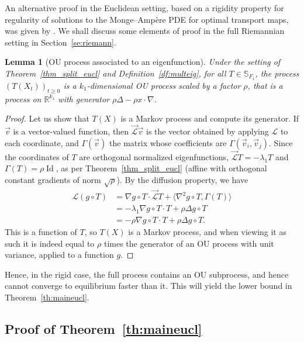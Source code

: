 \documentclass[10pt,reqno]{amsart}
\newtheorem{lemma}[theorem]{Lemma}
\numberwithin{equation}{section}
\begin{document}
An alternative proof in the Euclidean setting, based on a rigidity property
for regularity of solutions to the Monge--Ampère PDE for optimal transport
maps, was given by \cite{DPF17}. We shall discuss some elements of proof in
the full Riemannian setting in Section~\ref{se:riemann}.

\begin{lemma}[OU process associated to an eigenfunction] \label{lem_proj_ou}
  Under the setting of Theorem~\ref{thm_split_eucl} and
  Definition~\ref{df:multeig}, for all $T \in \mathbb{S}_{F_1}$, the process
  ${(T(X_t))}_{t\geq0}$ is a $k_1$-dimensional OU process scaled by a factor
  $\rho$, that is a process on $\mathbb{R}^{k_1}$ with generator
  $\rho \Delta - \rho x \cdot \nabla$.
\end{lemma}

\begin{proof}
  Let us show that $T(X)$ is a Markov process and compute its
  generator. %
  If $\vec{v}$ is a vector-valued function, then $\vec{\mathcal{L}} \vec{v} $
  is the vector obtained by applying $\mathcal{L}$ to each coordinate, and
  $\Gamma(\vec{v})$ the matrix whose coefficients are
  $\Gamma(\vec{v}_i, \vec{v}_j)$. Since the coordinates of $T$ are orthogonal
  normalized eigenfunctions, $\vec{\mathcal{L}} T = - \lambda_1 T$ and
  $\Gamma(T) = \rho \operatorname{Id}$, as per Theorem~\ref{thm_split_eucl}
  (affine with orthogonal constant gradients of norm $\sqrt{\rho}$). By the
  diffusion property, we have
  \begin{align}
    \mathcal{L}(g \circ T) &= \nabla g \circ T \cdot \vec{\mathcal{L}} T + \langle \nabla^2 g \circ T, \Gamma(T)\rangle \\
                  &= - \lambda_1 \nabla g\circ T \cdot T + \rho \Delta g \circ T \\
                  &= - \rho \nabla g\circ T \cdot T + \rho \Delta g \circ T.
  \end{align}
  This is a function of $T$, so $T(X)$ is a Markov process, and when viewing
  it as such it is indeed equal to $\rho$ times the generator of an OU process
  with unit variance, applied to a function $g$.
\end{proof}

Hence, in the rigid case, the full process contains an OU subprocess, and
hence cannot converge to equilibrium faster than it. This will yield the lower
bound in Theorem~\ref{th:maineucl}.

\subsection{Proof of Theorem~\ref{th:maineucl}}
\end{document}
